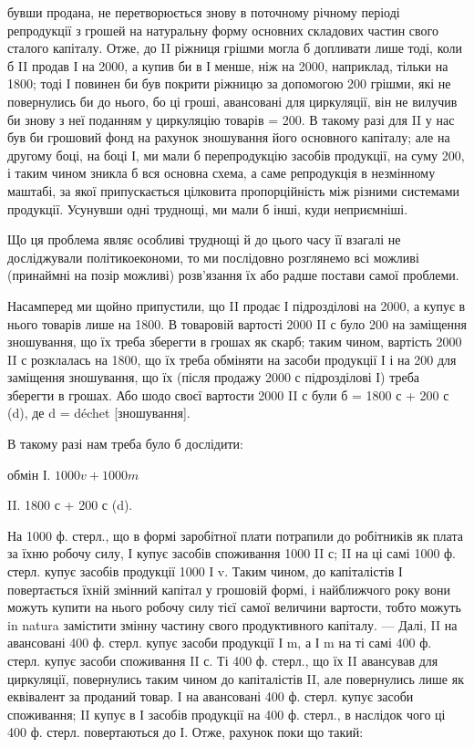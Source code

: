 \parcont{}  %
бувши продана, не перетворюється знову в поточному річному періоді
репродукції з грошей на натуральну форму основних складових частин
свого сталого капіталу. Отже, до II ріжниця грішми могла б допливати
лише тоді, коли б II продав І на 2000, а купив би в І менше, ніж на
2000, наприклад, тільки на 1800; тоді І повинен би був покрити
ріжницю за допомогою 200 грішми, які не повернулись би до нього, бо
ці гроші, авансовані для циркуляції, він не вилучив би знову з неї поданням
у циркуляцію товарів = 200. В такому разі для II у нас був би
грошовий фонд на рахунок зношування його основного капіталу; але на
другому боці, на боці І, ми мали б перепродукцію засобів продукції, на
суму 200, і таким чином зникла б вся основна схема, а саме репродукція
в незмінному маштабі, за якої припускається цілковита пропорційність
між різними системами продукції. Усунувши одні труднощі, ми мали б
інші, куди неприємніші.

Що ця проблема являє особливі труднощі й до цього часу її взагалі
не досліджували політикоекономи, то ми послідовно розглянемо всі можливі
(принаймні на позір можливі) розв'язання їх або радше постави
самої проблеми.

Насамперед ми щойно припустили, що II продає І підрозділові на
2000, а купує в нього товарів лише на 1800. В товаровій вартості
2000 II с було 200 на заміщення зношування, що їх треба зберегти
в грошах як скарб; таким чином, вартість 2000 II с розклалась на
1800, що їх треба обміняти на засоби продукції І і на 200 для заміщення
зношування, що їх (після продажу 2000 с підрозділові І) треба
зберегти в грошах. Або шодо своєї вартости 2000 II с були б = 1800 с +
200 с (d), де d = déchet [зношування].

В такому разі нам треба було б дослідити:

обмін І. $1000 v + 1000 m$

II.    1800 с + 200 с (d).

На 1000 ф. стерл., що в формі заробітної плати потрапили до робітників
як плата за їхню робочу силу, І купує засобів споживання
1000 II с; II на ці самі 1000 ф. стерл. купує засобів продукції 1000 І v.
Таким чином, до капіталістів І повертається їхній змінний капітал у
грошовій формі, і найближчого року вони можуть купити на нього робочу
силу тієї самої величини вартости, тобто можуть in natura замістити
змінну частину свого продуктивного капіталу. — Далі, II на авансовані
400 ф. стерл. купує засоби продукції І m, а І m на ті самі
400 ф. стерл. купує засоби споживання II с. Ті 400 ф. стерл., що їх II
авансував для циркуляції, повернулись таким чином до капіталістів II, але
повернулись лише як еквівалент за проданий товар. І на авансовані
400 ф. стерл. купує засоби споживання; II купує в І засобів продукції
на 400 ф. стерл., в наслідок чого ці 400 ф. стерл. повертаються до І.
Отже, рахунок поки що такий:
\parbreak{}  %

